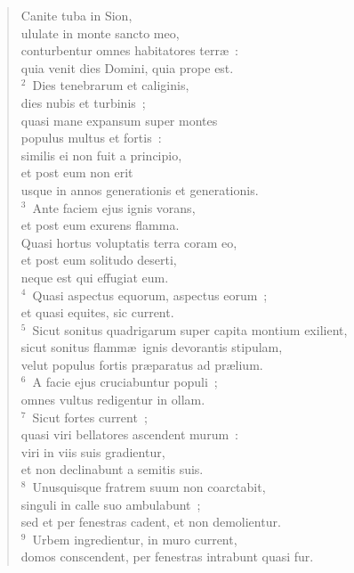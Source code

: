 \begin{flushleft}\begin{verse}\vspace{-19pt}Canite tuba in Sion,\\ ululate in monte sancto meo,\\ conturbentur omnes habitatores terr\ae~:\\ quia venit dies Domini, quia prope est.\\
${}^{2}$~Dies tenebrarum et caliginis,\\ dies nubis et turbinis~;\\ quasi mane expansum super montes\\ populus multus et fortis~:\\ similis ei non fuit a principio,\\ et post eum non erit\\ usque in annos generationis et generationis.\\
${}^{3}$~Ante faciem ejus ignis vorans,\\ et post eum exurens flamma.\\ Quasi hortus voluptatis terra coram eo,\\ et post eum solitudo deserti,\\ neque est qui effugiat eum.\\
${}^{4}$~Quasi aspectus equorum, aspectus eorum~;\\ et quasi equites, sic current.\\
${}^{5}$~Sicut sonitus quadrigarum super capita montium exilient,\\ sicut sonitus flamm\ae\ ignis devorantis stipulam,\\ velut populus fortis pr\ae paratus ad pr\ae lium.\\
${}^{6}$~A facie ejus cruciabuntur populi~;\\ omnes vultus redigentur in ollam.\\
${}^{7}$~Sicut fortes current~;\\ quasi viri bellatores ascendent murum~:\\ viri in viis suis gradientur,\\ et non declinabunt a semitis suis.\\
${}^{8}$~Unusquisque fratrem suum non coarctabit,\\ singuli in calle suo ambulabunt~;\\ sed et per fenestras cadent, et non demolientur.\\
${}^{9}$~Urbem ingredientur, in muro current,\\ domos conscendent, per fenestras intrabunt quasi fur.\\

\end{verse}
\end{flushleft}
